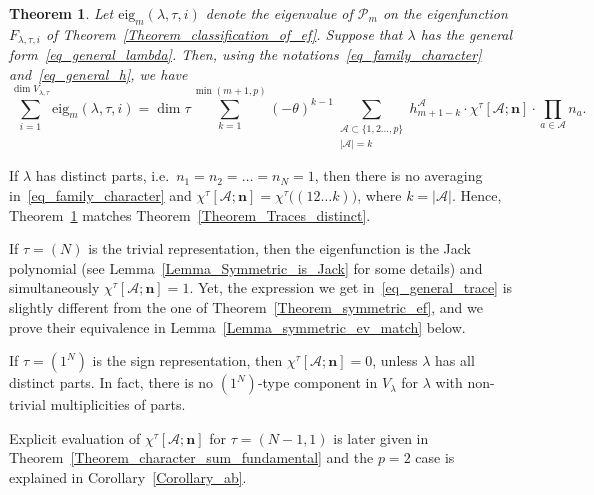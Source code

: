 \documentclass[11pt]{article}
\newtheorem{theorem}[theo]{Theorem}
\theoremstyle{definition}
\numberwithin{equation}{section}
\newcommand{\PP}{\mathcal P}
\begin{document}
\begin{theorem} \label{Theorem_Traces_general}
 Let $\mathrm{eig}_m(\lambda,\tau,i)$ denote the eigenvalue of $\PP_m$ on the eigenfunction $F_{\lambda,\tau,i}$  of Theorem~\ref{Theorem_classification_of_ef}. Suppose that $\lambda$ has the general form~\eqref{eq_general_lambda}. Then, using the notations~\eqref{eq_family_character} and~\eqref{eq_general_h}, we have
 \begin{equation}
 \label{eq_general_trace}
  \sum_{i=1}^{\dim V_{\lambda,\tau}} \mathrm{eig}_m(\lambda,\tau,i) = \dim \tau \sum_{k=1}^{\min(m+1,p)}  (-\theta)^{k-1} \sum_{\begin{smallmatrix}\mathcal A\subset \{1,2\dots,p\}\\ |\mathcal A|=k\end{smallmatrix}}  h^{\mathcal A}_{m+1-k} \cdot   \chi^\tau[\mathcal A; \mathbf n]\cdot \prod_{a\in \mathcal A} n_a.
 \end{equation}
\end{theorem}

If $\lambda$ has distinct parts, i.e.\ $n_1=n_2=\dots=n_N=1$, then there is no averaging in~\eqref{eq_family_character} and $ \chi^\tau[\mathcal A; \mathbf n]=\chi^\tau \bigl( (12\dots k) \bigr)$, where $k=|\mathcal A|$. Hence, Theorem~\ref{Theorem_Traces_general} matches Theorem~\ref{Theorem_Traces_distinct}.

If $\tau=(N)$ is the trivial representation, then the eigenfunction is the Jack polynomial (see Lemma~\ref{Lemma_Symmetric_is_Jack} for some details) and simultaneously $\chi^\tau[\mathcal A; \mathbf n]=1$. Yet, the expression we get in~\eqref{eq_general_trace} is slightly different from the one of Theorem~\ref{Theorem_symmetric_ef}, and we prove their equivalence in Lemma~\ref{Lemma_symmetric_ev_match} below.

If $\tau=(1^N)$ is the sign representation, then $\chi^{\tau}[\mathcal A; \mathbf n]=0$, unless $\lambda$ has all distinct parts. In fact, there is no $(1^N)$-type component in $V_\lambda$ for $\lambda$ with non-trivial multiplicities of parts.

Explicit evaluation of $\chi^{\tau}[\mathcal A; \mathbf n]$ for $\tau=(N-1,1)$ is later given in Theorem~\ref{Theorem_character_sum_fundamental} and the $p=2$ case is explained in Corollary~\ref{Corollary_ab}.
\end{document}
